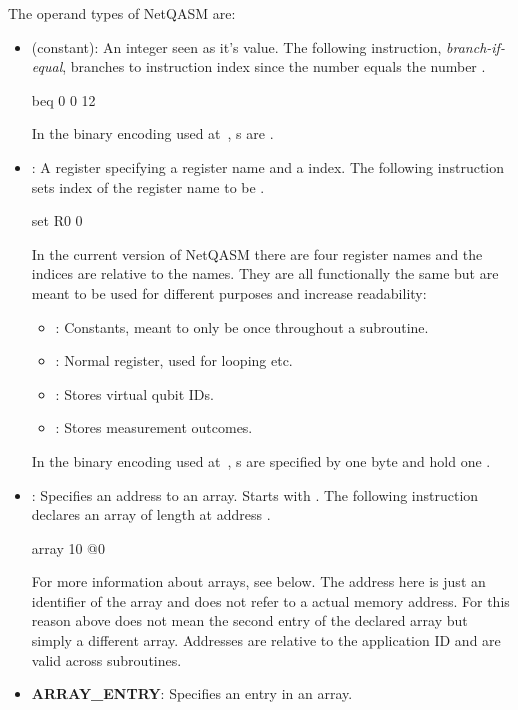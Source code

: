 The operand types of \ac{NetQASM} are:
\begin{itemize}
  \item \IMMEDIATE (constant): An integer seen as it's value.
        The following instruction,  \emph{branch-if-equal}, branches to instruction index  since the number  equals the number .
        \begin{nqcode}
beq 0 0 12\end{nqcode}
        In the binary encoding used at~\cite{git_netqasm}, \IMMEDIATE{}s are .
  \item \REGISTER: A register specifying a register name and a index.
        The following instruction sets index  of the register name  to be .
        \begin{nqcode}
set R0 0\end{nqcode}
        In the current version of \ac{NetQASM} there are four register names and the indices are relative to the names.
        They are all functionally the same but are meant to be used for different purposes and increase readability:
        \begin{itemize}
          \item {}: Constants, meant to only be  once throughout a subroutine.
          \item {}: Normal register, used for looping etc.
          \item {}: Stores virtual qubit IDs.
          \item {}: Stores measurement outcomes.
        \end{itemize}
        In the binary encoding used at~\cite{git_netqasm}, \REGISTER{}s are specified by one byte and hold one .
  \item \ADDRESS: Specifies an address to an array.
        Starts with .
        The following instruction declares an array of length  at address .
        \begin{nqcode}
array 10 @0\end{nqcode}
        For more information about arrays, see below.
        The address here is just an identifier of the array and does not refer to a actual memory address.
        For this reason  above does not mean the second entry of the declared array but simply a different array.
        Addresses are relative to the application ID and are valid across subroutines.
  \item \textbf{ARRAY\_ENTRY}: Specifies an entry in an array.

\end{itemize}
